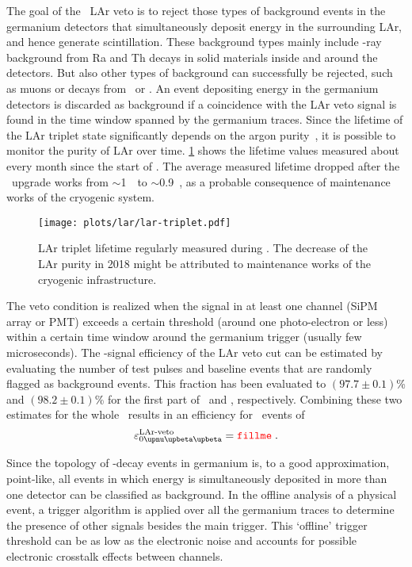 \newpar
The goal of the \gerda\ LAr veto is to reject those types of background events in the
germanium detectors that simultaneously deposit energy in the surrounding LAr, and hence
generate scintillation. These background types mainly include \g-ray background from Ra
and Th decays in solid materials inside and around the detectors. But also other types of
background can successfully be rejected, such as muons or decays from \Arh\ or \kvz. An
event depositing energy in the germanium detectors is discarded as background if a
coincidence with the LAr veto signal is found in the time window spanned by the germanium
traces.  Since the lifetime of the LAr triplet state significantly depends on the argon
purity~\cite{Amsler2007}, it is possible to monitor the purity of LAr over time.
\cref{fig:lar:triplet-lifetime} shows the lifetime values measured about every month since
the start of \phasetwo. The average measured lifetime dropped after the \phasetwop\
upgrade works from $\sim$1~\mus\ to $\sim$0.9~\mus, as a probable consequence of
maintenance works of the cryogenic system.
\begin{figure}
  \centering
  \texttt{[image: plots/lar/lar-triplet.pdf]}
  \caption{%
    LAr triplet lifetime regularly measured during \phasetwo. The decrease of the LAr
    purity in 2018 might be attributed to maintenance works of the cryogenic
    infrastructure.
  }\label{fig:lar:triplet-lifetime}
\end{figure}
The veto condition is realized when the signal in at least one channel (SiPM array or PMT)
exceeds a certain threshold (around one photo-electron or less) within a certain time
window around the germanium trigger (usually few microseconds). The \onbb-signal
efficiency of the LAr veto cut can be estimated by evaluating the number of test pulses
and baseline events that are randomly flagged as background events. This fraction has been
evaluated to $(97.7 \pm 0.1)$\% and $(98.2 \pm 0.1)$\% for the first part of \phasetwo\
and \phasetwop, respectively. Combining these two estimates for the whole \phasetwo\
results in an efficiency for \onbb\ events of
\[
  \epsilon_\onbbM^\text{LAr-veto} = \fillme{fillme} \;.
\]

Since the topology of \onbb-decay events in germanium is, to a good approximation,
point-like, all events in which energy is simultaneously deposited in more than one
detector can be classified as background. In the offline analysis of a physical event, a
trigger algorithm is applied over all the germanium traces to determine the presence of
other signals besides the main trigger. This `offline' trigger threshold can be as low as
the electronic noise and accounts for possible electronic crosstalk effects between
channels.

